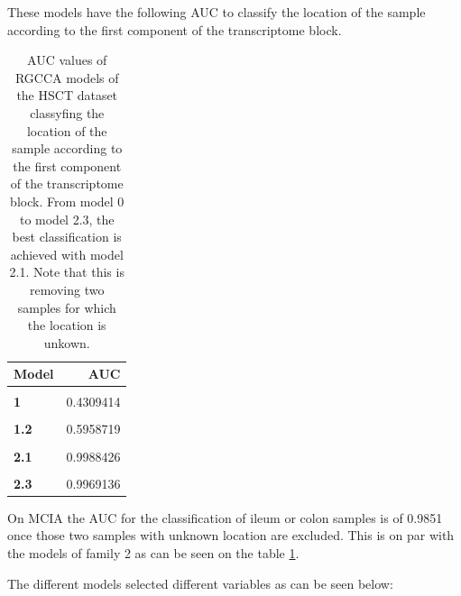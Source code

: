 \documentclass[
  a4paper,
]{book}
\begin{document}
These models have the following AUC to classify the location of the sample according to the first component of the transcriptome block.

\begin{table}[H]

\caption[AUC values of RGCCA models on the HSCT dataset.]{\label{tab:hsct-auc}AUC values of RGCCA models of the HSCT dataset classyfing the location of the sample according to the first component of the transcriptome block. From model 0 to model 2.3, the best classification is achieved with model 2.1. Note that this is removing two samples for which the location is unkown.}
\centering
\begin{tabular}[t]{|>{}l|>{}r|}
\hline
\textbf{Model} & \textbf{AUC}\\
\hline
\textbf{\cellcolor{gray!6}{0}} & \cellcolor{gray!6}{0.4537037}\\
\hline
\textbf{1} & 0.4309414\\
\hline
\textbf{\cellcolor{gray!6}{1.1}} & \cellcolor{gray!6}{0.4639275}\\
\hline
\textbf{1.2} & 0.5958719\\
\hline
\textbf{\cellcolor{gray!6}{2}} & \cellcolor{gray!6}{0.9450231}\\
\hline
\textbf{2.1} & 0.9988426\\
\hline
\textbf{\cellcolor{gray!6}{2.2}} & \cellcolor{gray!6}{0.9980710}\\
\hline
\textbf{2.3} & 0.9969136\\
\hline
\end{tabular}
\end{table}

On MCIA the AUC for the classification of ileum or colon samples is of 0.9851 once those two samples with unknown location are excluded.
This is on par with the models of family 2 as can be seen on the table \ref{tab:hsct-auc}.

The different models selected different variables as can be seen below:
\end{document}
